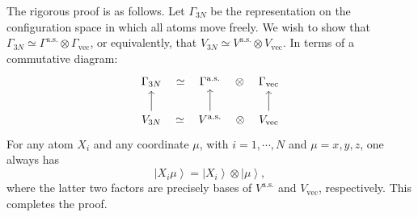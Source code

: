 \documentclass[lang=en, column=onecolumn, mathfont=times]{spArticle}
\begin{document}
The rigorous proof is as follows. Let $\Gamma_{3N}$ be the representation on the configuration space in which all atoms move freely. We wish to show that $\Gamma_{3N} \simeq \Gamma^{\mathrm{a.s.}} \otimes \Gamma_{\mathrm{vec}}$, or equivalently, that $V_{3N} \simeq V^{\mathrm{a.s.}} \otimes V_{\mathrm{vec}}$. In terms of a commutative diagram:
\[
\begin{tikzcd}[
        background color=white,      %
        every label/.append style={  %
            inner sep=2pt              %
        }
        ]
        \Gamma_{3N} \arrow[r, "\simeq" description, no head, phantom]
            & \Gamma^{\mathrm{a.s.}} \arrow[r, "\otimes" description, no head, phantom] & \Gamma_{\mathrm{vec}} \\
        V_{3N} \arrow[u] \arrow[r, "\simeq" description, no head, phantom]
            & V^{\mathrm{a.s.}} \arrow[u] \arrow[r, "\otimes" description, no head, phantom] & V_{\mathrm{vec}} \arrow[u]
        \end{tikzcd}
\]
For any atom $X_i$ and any coordinate $\mu$, with $i=1,\cdots, N$ and $\mu=x,y,z$, one always has
\begin{equation}
    \left| X_i\mu \right> =\left| X_i \right> \otimes \left| \mu \right>,
\end{equation}
where the latter two factors are precisely bases of $V^{\mathrm{a.s.}}$ and $V_{\mathrm{vec}}$, respectively. This completes the proof.
\end{document}
